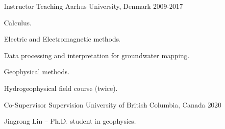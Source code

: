 

\begin{cventries}

  \cventry
    {Instructor} %
    {Teaching} %
    {Aarhus University, Denmark} %
    {2009-2017} %
    {
      \begin{cvitems} %
        \item {Calculus.}
        \item {Electric and Electromagnetic methods.}
        \item {Data processing and interpretation for groundwater mapping.}
        \item {Geophysical methods.}
        \item {Hydrogeophysical field course (twice).}
      \end{cvitems}
    }

  \cventry
    {Co-Supervisor} %
    {Supervision} %
    {University of British Columbia, Canada} %
    {2020} %
    {
      \begin{cvitems} %
        \item {Jingrong Lin -- Ph.D. student in geophysics.}
      \end{cvitems}
    }


\end{cventries}
